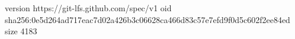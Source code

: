 version https://git-lfs.github.com/spec/v1
oid sha256:0e5d264ad717eac7d02a426b3c06628ca466d83c57e7efd9f0d5c602f2ee84ed
size 4183
